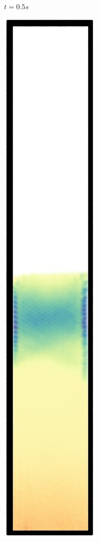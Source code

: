 \begin{figure}[h]
\begin{subfigure}[t]{0.09\textwidth}
    \caption{\small{$t=0.5s$}}
  \end{subfigure}%
  \begin{subfigure}[t]{0.09\textwidth}
    \includegraphics[width=\textwidth]{images/oscillate/060.jpg}

\end{subfigure}
\end{figure}
